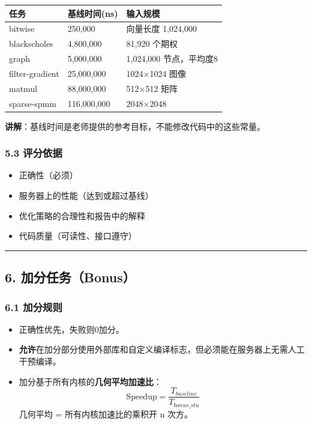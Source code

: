 \documentclass[11pt, a4paper]{article}
\begin{document}
\begin{aibox}
\vspace{0.5em}
\begin{tabularx}{\textwidth}{@{} l l X @{}}
\toprule
任务 & 基线时间(ns) & 输入规模 \\
\midrule
bitwise & 250,000 & 向量长度 1,024,000 \\
blackscholes & 4,800,000 & 81,920 个期权 \\
graph & 5,000,000 & 1,024,000 节点，平均度8 \\
filter-gradient & 25,000,000 & 1024$\times$1024 图像 \\
matmul & 88,000,000 & 512$\times$512 矩阵 \\
sparse-spmm & 116,000,000 & 2048$\times$2048 \\
\bottomrule
\end{tabularx}
\vspace{0.5em}

\textbf{讲解}：基线时间是老师提供的参考目标，不能修改代码中的这些常量。

\subsubsection*{5.3 评分依据}
\begin{itemize}
    \item 正确性（必须）
    \item 服务器上的性能（达到或超过基线）
    \item 优化策略的合理性和报告中的解释
    \item 代码质量（可读性、接口遵守）
\end{itemize}

\begin{center}\rule{\textwidth}{0.4pt}\end{center}

\subsection*{6. 加分任务（Bonus）}

\subsubsection*{6.1 加分规则}
\begin{itemize}
    \item 正确性优先，失败则0加分。
    \item \textbf{允许}在加分部分使用外部库和自定义编译标志，但必须能在服务器上无需人工干预编译。
    \item 加分基于所有内核的\textbf{几何平均加速比}：
    \[ \text{Speedup} = \frac{T_{baseline}}{T_{bonus\_stu}} \]
    几何平均 = 所有内核加速比的乘积开 n 次方。
\end{itemize}


\end{aibox}
\end{document}

